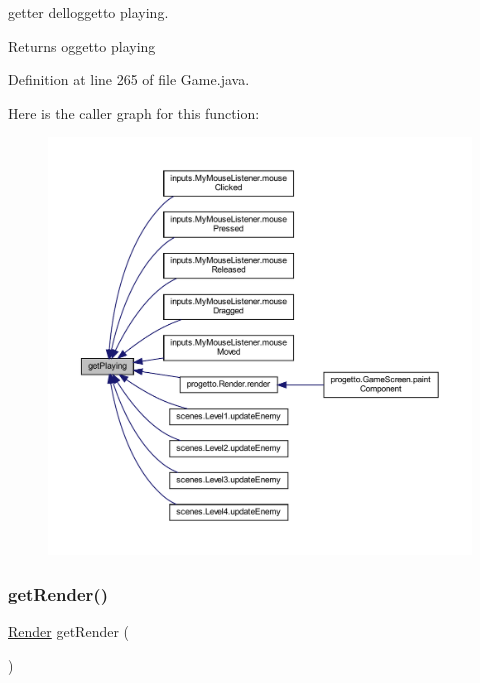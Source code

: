 getter dell\textquotesingle{}oggetto playing. 

\begin{DoxyReturn}{Returns}
oggetto playing 
\end{DoxyReturn}


Definition at line 265 of file Game.\+java.

Here is the caller graph for this function\+:\nopagebreak
\begin{figure}[H]
\begin{center}
\leavevmode
\includegraphics[width=350pt]{classprogetto_1_1_game_a5ef843d72d0871e312ff734c6a129dd2_icgraph}
\end{center}
\end{figure}
\mbox{\label{classprogetto_1_1_game_a4cf2c70ad6b93232b970eee06767cab1}} 
\subsubsection{\texorpdfstring{get\+Render()}{getRender()}}
{\footnotesize\ttfamily \hyperlink{classprogetto_1_1_render}{Render} get\+Render (\begin{DoxyParamCaption}{ }\end{DoxyParamCaption})}



